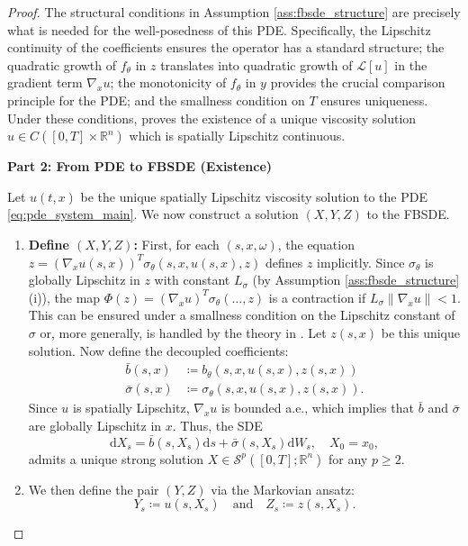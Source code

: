 \documentclass[qian]{imsart}
\newcommand{\R}{\mathbb{R}}
\newcommand{\dd}{\mathrm{d}}
\newcommand{\norm}[1]{\left\lVert#1\right\rVert}
\theoremstyle{plain}
\theoremstyle{definition}
\begin{document}
\begin{proof}
The structural conditions in Assumption \ref{ass:fbsde_structure} are precisely what is needed for the well-posedness of this PDE. Specifically, the Lipschitz continuity of the coefficients ensures the operator has a standard structure; the quadratic growth of $f_\theta$ in $z$ translates into quadratic growth of $\mathcal{L}[u]$ in the gradient term $\nabla_x u$; the monotonicity of $f_\theta$ in $y$ provides the crucial comparison principle for the PDE; and the smallness condition on $T$ ensures uniqueness. Under these conditions, \cite{Delarue2002} proves the existence of a unique viscosity solution $u \in C([0,T]\times\R^n)$ which is spatially Lipschitz continuous.

\textbf{Part 2: From PDE to FBSDE (Existence)}

Let $u(t,x)$ be the unique spatially Lipschitz viscosity solution to the PDE \eqref{eq:pde_system_main}. We now construct a solution $(X,Y,Z)$ to the FBSDE.
\begin{enumerate}
    \item \textbf{Define $(X, Y, Z)$:} First, for each $(s,x,\omega)$, the equation $z = (\nabla_x u(s,x))^T \sigma_\theta(s, x, u(s,x), z)$ defines $z$ implicitly. Since $\sigma_\theta$ is globally Lipschitz in $z$ with constant $L_\sigma$ (by Assumption \ref{ass:fbsde_structure}(i)), the map $\Phi(z) = (\nabla_x u)^T \sigma_\theta(\dots,z)$ is a contraction if $L_\sigma \norm{\nabla_x u} < 1$. This can be ensured under a smallness condition on the Lipschitz constant of $\sigma$ or, more generally, is handled by the theory in \cite{Delarue2002}. Let $z(s,x)$ be this unique solution. Now define the decoupled coefficients:
    \begin{align*}
        \bar{b}(s,x) &\coloneqq b_\theta(s, x, u(s,x), z(s,x)) \\
        \bar{\sigma}(s,x) &\coloneqq \sigma_\theta(s, x, u(s,x), z(s,x)).
    \end{align*}
    Since $u$ is spatially Lipschitz, $\nabla_x u$ is bounded a.e., which implies that $\bar{b}$ and $\bar{\sigma}$ are globally Lipschitz in $x$. Thus, the SDE
    \[ \dd X_s = \bar{b}(s,X_s) \dd s + \bar{\sigma}(s,X_s) \dd W_s, \quad X_0 = x_0, \]
    admits a unique strong solution $X \in \mathcal{S}^p([0,T];\R^n)$ for any $p \ge 2$.
    
    \item We then define the pair $(Y,Z)$ via the Markovian ansatz:
    \[ Y_s \coloneqq u(s, X_s) \quad \text{and} \quad Z_s \coloneqq z(s,X_s). \]
    

\end{enumerate}
\end{proof}
\end{document}
